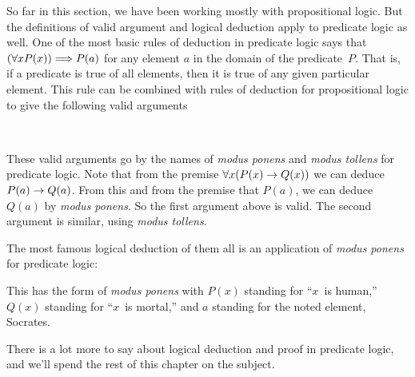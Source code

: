 So far in this section, we have been working mostly with propositional
logic.  But the definitions of valid argument and logical deduction
apply to predicate logic as well.  One of the most basic rules of
deduction in predicate logic says that $(\forall xP(x))\Longrightarrow P(a)$
for any element $a$ in the domain of the predicate~$P$.
That is, if a predicate is true of all elements, then it is true of
any given particular element.  This rule can be combined with 
rules of deduction for propositional logic to give the following
valid arguments
\begin{center}
\mbox{
\qquad\qquad
{}
}
\end{center}
These valid arguments go by the names of \textit{modus ponens} and
\textit{modus tollens} for predicate logic.
Note that from the premise $\forall x(P(x)\rightarrow Q(x))$ we can deduce
$P(a)\rightarrow Q(a)$.  From this and from the premise that $P(a)$, we
can deduce $Q(a)$ by \textit{modus ponens}.  So the first argument
above is valid.  The second argument is similar, using 
\textit{modus tollens}.

The most famous logical deduction of them all is an application
of \textit{modus ponens} for predicate logic:
\begin{center}
\end{center}
This has the form of \textit{modus ponens} with $P(x)$ standing
for ``$x$~is human,'' $Q(x)$ standing for ``$x$~is mortal,'' and
$a$ standing for the noted element, Socrates.

There is a lot more to say about logical deduction and
proof in predicate logic, and we'll spend the rest of this chapter
on the subject.

